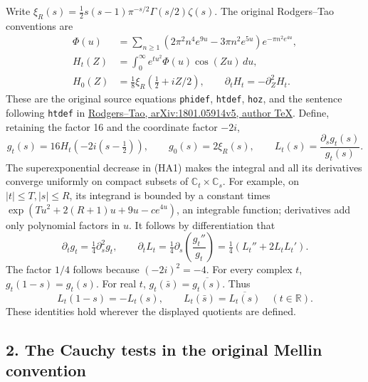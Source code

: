 \documentclass[
  10pt,
  a4paper,
]{article}
\begin{document}
Write \(\xi_R(s)=\tfrac12s(s-1)\pi^{-s/2}\Gamma(s/2)\zeta(s)\). The
original Rodgers--Tao conventions are \[
\begin{aligned}
\Phi(u)&=\sum_{n\ge1}(2\pi^2n^4e^{9u}-3\pi n^2e^{5u})e^{-\pi n^2e^{4u}},\\
H_t(Z)&=\int_0^\infty e^{tu^2}\Phi(u)\cos(Zu)\,du,\\
H_0(Z)&=\tfrac18\xi_R(\tfrac12+iZ/2),\qquad
\partial_tH_t=-\partial_Z^2H_t.
\end{aligned}\tag{HA1}
\] These are the original source equations \texttt{phidef},
\texttt{htdef}, \texttt{hoz}, and the sentence following \texttt{htdef}
in \href{https://arxiv.org/src/1801.05914v5}{Rodgers--Tao,
arXiv:1801.05914v5, author TeX}. Define, retaining the factor 16 and the
coordinate factor \(-2i\), \[
g_t(s)=16H_t(-2i(s-\tfrac12)),\qquad g_0(s)=2\xi_R(s),
\qquad L_t(s)=\frac{\partial_sg_t(s)}{g_t(s)}.
\tag{HA2}
\] The superexponential decrease in (HA1) makes the integral and all its
derivatives converge uniformly on compact subsets of
\(\mathbb C_t\times\mathbb C_s\). For example, on \(|t|\le T,|s|\le R\),
its integrand is bounded by a constant times
\(\exp(Tu^2+2(R+1)u+9u-ce^{4u})\), an integrable function; derivatives
add only polynomial factors in \(u\). It follows by differentiation that
\[
\partial_tg_t=\tfrac14\partial_s^2g_t,\qquad
\partial_tL_t=\tfrac14\partial_s\left(\frac{g_t''}{g_t}\right)
=\tfrac14(L_t''+2L_tL_t').
\tag{HA3}
\] The factor \(1/4\) follows because \((-2i)^2=-4\). For every complex
\(t\), \(g_t(1-s)=g_t(s)\). For real \(t\),
\(g_t(\bar s)=\overline{g_t(s)}\). Thus \[
L_t(1-s)=-L_t(s),\qquad
L_t(\bar s)=\overline{L_t(s)}\quad(t\in\mathbb R).
\tag{HA4}
\] These identities hold wherever the displayed quotients are defined.

\subsection{2. The Cauchy tests in the original Mellin
convention}\label{the-cauchy-tests-in-the-original-mellin-convention}
\end{document}

